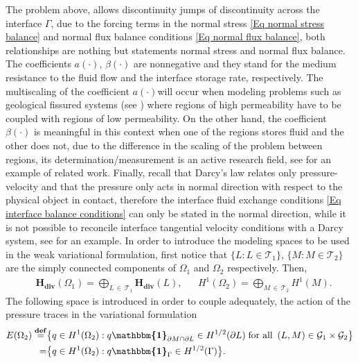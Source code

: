 \documentclass[3p]{elsarticle}
\def\Hdiv{\mathbf{H_{div}}}
\def\defining{\overset{\mathbf{def}} =}
\def\tone{\mathcal{T}_{1} }%
\def\ttwo{\mathcal{T}_{2}} %
\def\mapone{\mathcal{G}_{1} }%
\def\maptwo{\mathcal{G}_{2}} %
\def\ind{\boldsymbol{\mathbbm{1}}}
\begin{document}
%
%
%
\noindent The problem above, allows discontinuity jumps of discontinuity across the interface $\Gamma$, due to the forcing terms in the normal stress  \eqref{Eq normal stress balance} and normal flux balance conditions \eqref{Eq normal flux balance}, both relationships are nothing but statements normal stress and normal flux balance. The coefficients $a(\cdot)$, $\beta(\cdot)$ are nonnegative and they stand for the medium resistance to the fluid flow and the interface storage rate, respectively. The multiscaling of the coefficient $ a(\cdot) $will occur when modeling problems such as geological fissured systems (see \cite{Morales2}) where regions of high permeability have to be coupled with regions of low permeability. On the other hand, the coefficient $ \beta (\cdot) $ is meaningful in this context when one of the regions stores fluid and the other does not, due to the difference in the scaling of the problem between regions, its determination/measurement is an active research field, see \cite{BhunyaStorage} for an example of related work. Finally, recall that Darcy's law relates only pressure-velocity and that the pressure only acts in normal direction with respect to the physical object in contact, therefore the interface fluid exchange conditions \eqref{Eq interface balance conditions} can only be stated in the normal direction, while it is not possible to reconcile interface tangential velocity conditions with a Darcy system, see \cite{MoralesShow3} for an example.
%
\newline
\newline
In order to introduce the modeling spaces to be used in the weak variational formulation, first notice that $\big\{L: L\in \tone \big\}$, $\big\{M: M\in \ttwo \big\}$ are the simply connected components of $\Omega_{1}$ and $\Omega_{2}$ respectively. Then, 
%
\begin{align*} %
& \Hdiv(\Omega_{1}) = \bigoplus_{L \,\in \, \tone} \Hdiv(L)  , &
& H^{1}(\Omega_{2}) = \bigoplus_{M \,\in \, \ttwo} H^{1}(M) .
\end{align*}
%
The following space is introduced in order to couple adequately, the action of the pressure traces in the variational formulation
\begin{equation}\label{Eq Decoupling Trace Statement}
\begin{split}
E(\Omega_{2})  \defining & \big\{ q\in H^{1}(\Omega_{2}): 
q\ind_{\partial M \cap \partial L }\in H^{1/2}(\partial L ) \; \text{for all }\, 
(L, M) \in\mapone\times\maptwo\big\}\\
%
=  & \big\{ q\in H^{1}(\Omega_{2}): 
q\ind_{\Gamma }\in H^{1/2}(\Gamma ) \big\} .
\end{split} 
\end{equation}
\end{document}
